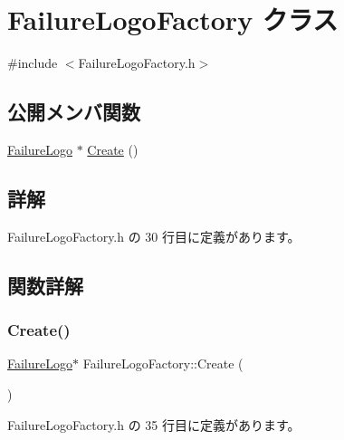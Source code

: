 \hypertarget{class_failure_logo_factory}{}\section{Failure\+Logo\+Factory クラス}
\label{class_failure_logo_factory}


{\ttfamily \#include $<$Failure\+Logo\+Factory.\+h$>$}

\subsection*{公開メンバ関数}
\begin{DoxyCompactItemize}
\item 
\mbox{\hyperlink{class_failure_logo}{Failure\+Logo}} $\ast$ \mbox{\hyperlink{class_failure_logo_factory_a623d73668a89fceca9dc013112b4c8a3}{Create}} ()
\end{DoxyCompactItemize}


\subsection{詳解}


 Failure\+Logo\+Factory.\+h の 30 行目に定義があります。



\subsection{関数詳解}
\mbox{\label{class_failure_logo_factory_a623d73668a89fceca9dc013112b4c8a3}} 
\subsubsection{\texorpdfstring{Create()}{Create()}}
{\footnotesize\ttfamily \mbox{\hyperlink{class_failure_logo}{Failure\+Logo}}$\ast$ Failure\+Logo\+Factory\+::\+Create (\begin{DoxyParamCaption}{ }\end{DoxyParamCaption})\hspace{0.3cm}{\ttfamily [inline]}}



 Failure\+Logo\+Factory.\+h の 35 行目に定義があります。

